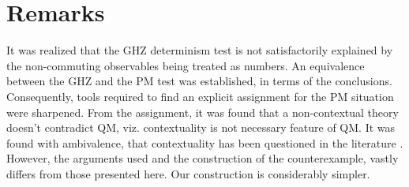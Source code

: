 \section{Remarks}

It was realized that the GHZ determinism test is not satisfactorily
explained by the non-commuting observables being treated as numbers.
An equivalence between the GHZ and the PM test was established, in
terms of the conclusions. Consequently, tools required to find an
explicit assignment for the PM situation were sharpened. From the
assignment, it was found that a non-contextual theory doesn't contradict
QM, viz. contextuality is not necessary feature of QM. It was found
with ambivalence, that contextuality has been questioned in the literature
\cite{NoContextuality}. However, the arguments used and the construction
of the counterexample, vastly differs from those presented here. Our
construction is considerably simpler.

